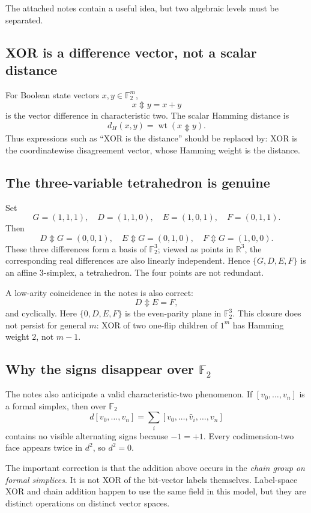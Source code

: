 \documentclass[11pt]{article}
\newcommand{\Ftwo}{\mathbb F_2}
\newcommand{\wt}{\operatorname{wt}}
\newcommand{\Updown}{\mathbin{\Updownarrow}}
\begin{document}
The attached notes contain a useful idea, but two algebraic levels must be separated.

\subsection{XOR is a difference vector, not a scalar distance}
For Boolean state vectors $x,y\in\Ftwo^m$,
\[
x\Updown y=x+y
\]
is the vector difference in characteristic two.  The scalar Hamming distance is
\[
d_H(x,y)=\wt(x\Updown y).
\]
Thus expressions such as ``XOR is the distance'' should be replaced by: XOR is the coordinatewise disagreement vector, whose Hamming weight is the distance.

\subsection{The three-variable tetrahedron is genuine}
Set
\[
G=(1,1,1),\quad D=(1,1,0),\quad E=(1,0,1),\quad F=(0,1,1).
\]
Then
\[
D\Updown G=(0,0,1),\quad E\Updown G=(0,1,0),\quad F\Updown G=(1,0,0).
\]
These three differences form a basis of $\Ftwo^3$; viewed as points in $\mathbb R^3$, the corresponding real differences are also linearly independent.  Hence $\{G,D,E,F\}$ is an affine $3$-simplex, a tetrahedron.  The four points are not redundant.

A low-arity coincidence in the notes is also correct:
\[
D\Updown E=F,
\]
and cyclically.  Here $\{0,D,E,F\}$ is the even-parity plane in $\Ftwo^3$.  This closure does not persist for general $m$: XOR of two one-flip children of $1^m$ has Hamming weight $2$, not $m-1$.

\subsection{Why the signs disappear over \texorpdfstring{$\Ftwo$}{F2}}
The notes also anticipate a valid characteristic-two phenomenon.  If $[v_0,\dots,v_n]$ is a formal simplex, then over $\Ftwo$
\[
d[v_0,\dots,v_n]
=\sum_i[v_0,\dots,\widehat v_i,\dots,v_n]
\]
contains no visible alternating signs because $-1=+1$.  Every codimension-two face appears twice in $d^2$, so $d^2=0$.

The important correction is that the addition above occurs in the \emph{chain group on formal simplices}.  It is not XOR of the bit-vector labels themselves.  Label-space XOR and chain addition happen to use the same field in this model, but they are distinct operations on distinct vector spaces.
\end{document}
